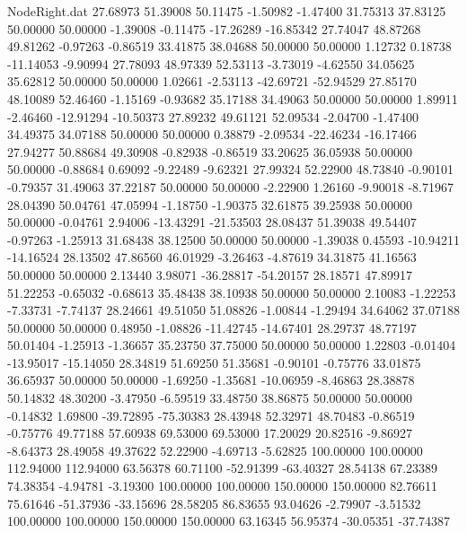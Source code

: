 \begin{filecontents}{NodeRight.dat}
  27.68973   51.39008   50.11475    -1.50982   -1.47400   31.75313   37.83125   50.00000   50.00000   -1.39008   -0.11475  -17.26289  -16.85342
  27.74047   48.87268   49.81262    -0.97263   -0.86519   33.41875   38.04688   50.00000   50.00000    1.12732    0.18738  -11.14053   -9.90994
  27.78093   48.97339   52.53113    -3.73019   -4.62550   34.05625   35.62812   50.00000   50.00000    1.02661   -2.53113  -42.69721  -52.94529
  27.85170   48.10089   52.46460    -1.15169   -0.93682   35.17188   34.49063   50.00000   50.00000    1.89911   -2.46460  -12.91294  -10.50373
  27.89232   49.61121   52.09534    -2.04700   -1.47400   34.49375   34.07188   50.00000   50.00000    0.38879   -2.09534  -22.46234  -16.17466
  27.94277   50.88684   49.30908    -0.82938   -0.86519   33.20625   36.05938   50.00000   50.00000   -0.88684    0.69092   -9.22489   -9.62321
  27.99324   52.22900   48.73840    -0.90101   -0.79357   31.49063   37.22187   50.00000   50.00000   -2.22900    1.26160   -9.90018   -8.71967
  28.04390   50.04761   47.05994    -1.18750   -1.90375   32.61875   39.25938   50.00000   50.00000   -0.04761    2.94006  -13.43291  -21.53503
  28.08437   51.39038   49.54407    -0.97263   -1.25913   31.68438   38.12500   50.00000   50.00000   -1.39038    0.45593  -10.94211  -14.16524
  28.13502   47.86560   46.01929    -3.26463   -4.87619   34.31875   41.16563   50.00000   50.00000    2.13440    3.98071  -36.28817  -54.20157
  28.18571   47.89917   51.22253    -0.65032   -0.68613   35.48438   38.10938   50.00000   50.00000    2.10083   -1.22253   -7.33731   -7.74137
  28.24661   49.51050   51.08826    -1.00844   -1.29494   34.64062   37.07188   50.00000   50.00000    0.48950   -1.08826  -11.42745  -14.67401
  28.29737   48.77197   50.01404    -1.25913   -1.36657   35.23750   37.75000   50.00000   50.00000    1.22803   -0.01404  -13.95017  -15.14050
  28.34819   51.69250   51.35681    -0.90101   -0.75776   33.01875   36.65937   50.00000   50.00000   -1.69250   -1.35681  -10.06959   -8.46863
  28.38878   50.14832   48.30200    -3.47950   -6.59519   33.48750   38.86875   50.00000   50.00000   -0.14832    1.69800  -39.72895  -75.30383
  28.43948   52.32971   48.70483    -0.86519   -0.75776   49.77188   57.60938   69.53000   69.53000   17.20029   20.82516   -9.86927   -8.64373
  28.49058   49.37622   52.22900    -4.69713   -5.62825  100.00000  100.00000  112.94000  112.94000   63.56378   60.71100  -52.91399  -63.40327
  28.54138   67.23389   74.38354    -4.94781   -3.19300  100.00000  100.00000  150.00000  150.00000   82.76611   75.61646  -51.37936  -33.15696
  28.58205   86.83655   93.04626    -2.79907   -3.51532  100.00000  100.00000  150.00000  150.00000   63.16345   56.95374  -30.05351  -37.74387

\end{filecontents}
